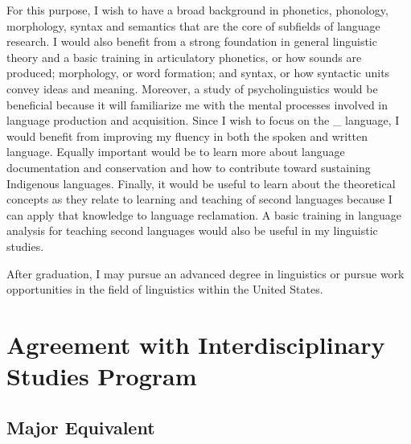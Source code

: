 \documentclass[11pt,oneside]{article}
\begin{document}
For this purpose, I wish to have a broad background in phonetics, phonology, morphology, syntax and semantics that are the core of subfields of language research. I would also benefit from a strong foundation in general linguistic theory and a basic training in articulatory phonetics, or how sounds are produced; morphology, or word formation; and syntax, or how syntactic units convey ideas and meaning. Moreover, a study of psycholinguistics would be beneficial because it will familiarize me with the mental processes involved in language production and acquisition. Since I wish to focus on the \_ language, I would benefit from improving my fluency in both the spoken and written language.  Equally important would be to learn more about language documentation and conservation and how to contribute toward sustaining Indigenous languages. Finally, it would be useful to learn about the theoretical concepts as they relate to learning and teaching of second languages because I can apply that knowledge to language reclamation. A basic training in language analysis for teaching second languages would also be useful in my linguistic studies.
	
After graduation, I may pursue an advanced degree in linguistics or pursue work opportunities in the field of linguistics within the United States.




\newpage
\section*{Agreement with Interdisciplinary Studies Program}
\subsection*{Major Equivalent}
\end{document}
